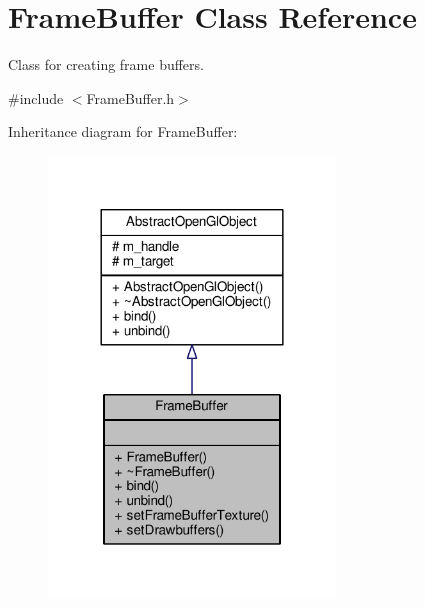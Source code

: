 \hypertarget{class_frame_buffer}{\section{Frame\-Buffer Class Reference}
\label{class_frame_buffer}
}


Class for creating frame buffers.  




{\ttfamily \#include $<$Frame\-Buffer.\-h$>$}



Inheritance diagram for Frame\-Buffer\-:\nopagebreak
\begin{figure}[H]
\begin{center}
\leavevmode
\includegraphics[width=216pt]{class_frame_buffer__inherit__graph}
\end{center}
\end{figure}


